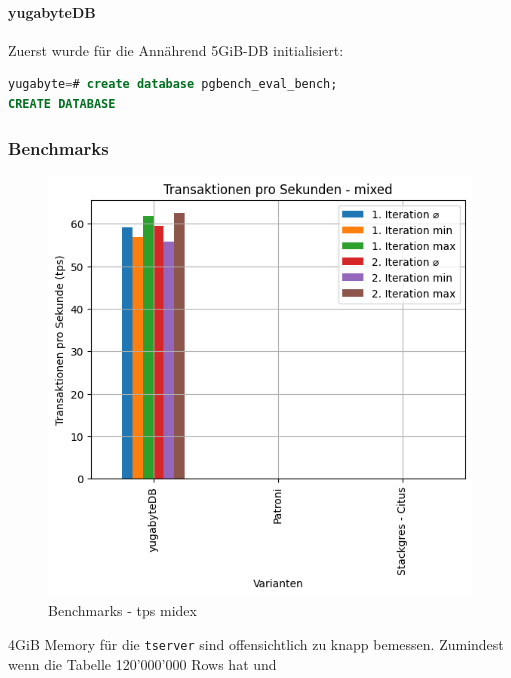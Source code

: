 
\begin{flushleft}
    \paragraph{yugabyteDB}
    Zuerst wurde für die Annährend 5GiB-DB initialisiert:
\lstset{style=gra_codestyle}
\begin{lstlisting}[language=sql, caption=yugabyteDB - Benchmarking - DB erstellen,captionpos=b,label={lst:yugabytedb-benchmarking-create-db},breaklines=true]
yugabyte=# create database pgbench_eval_bench;
CREATE DATABASE
\end{lstlisting}


    \subsubsection{Benchmarks}
    \begin{figure}[H]
        \centering
        \includegraphics[width=1\linewidth]{source/pandas_data_chart_plotter/tps_mixed}
        \caption{Benchmarks - tps midex}
        \label{fig:tps_mixed}
    \end{figure}
\end{flushleft}
\begin{flushleft}
    \begin{warning}
        4GiB Memory für die \texttt{tserver} sind offensichtlich zu knapp bemessen.
        Zumindest wenn die Tabelle 120'000'000 Rows hat und
    \end{warning}
\end{flushleft}
